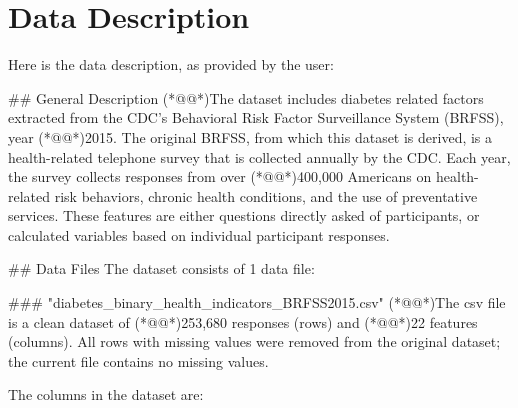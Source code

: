\documentclass[11pt]{article}
\begin{document}
\clearpage
\appendix

\section{Data Description} \label{sec:data_description} Here is the data description, as provided by the user:

\begin{codeoutput}
\#\# General Description
(*@@*)The dataset includes diabetes related factors extracted from the CDC's Behavioral Risk Factor Surveillance System (BRFSS), year (*@@*)2015.
The original BRFSS, from which this dataset is derived, is a health-related telephone survey that is collected annually by the CDC.
Each year, the survey collects responses from over (*@@*)400,000 Americans on health-related risk behaviors, chronic health conditions, and the use of preventative services. These features are either questions directly asked of participants, or calculated variables based on individual participant responses.

\#\# Data Files
The dataset consists of 1 data file:

\#\#\# "diabetes\_binary\_health\_indicators\_BRFSS2015.csv"
(*@@*)The csv file is a clean dataset of (*@@*)253,680 responses (rows) and (*@@*)22 features (columns).
All rows with missing values were removed from the original dataset; the current file contains no missing values.

The columns in the dataset are:


\end{codeoutput}
\end{document}
